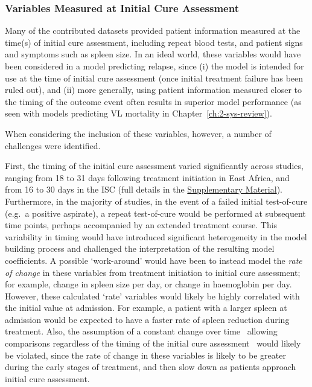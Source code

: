 \subsubsection{Variables Measured at Initial Cure Assessment}

Many of the contributed datasets provided patient information measured at the time(s) of initial cure assessment, including repeat blood tests, and patient signs and symptoms such as spleen size. In an ideal world, these variables would have been considered in a model predicting relapse, since (i) the model is intended for use at the time of initial cure assessment (once initial treatment failure has been ruled out), and (ii) more generally, using patient information measured closer to the timing of the outcome event often results in superior model performance (as seen with models predicting VL mortality in Chapter~\ref{ch:2-sys-review}).

When considering the inclusion of these variables, however, a number of challenges were identified.

First, the timing of the initial cure assessment varied significantly across studies, ranging from 18 to 31 days following treatment initiation in East Africa, and from 16 to 30 days in the ISC (full details in the \href{https://github.com/jpwil/dphil}{Supplementary Material}). Furthermore, in the majority of studies, in the event of a failed initial test-of-cure (e.g.\ a positive aspirate), a repeat test-of-cure would be performed at subsequent time points, perhaps accompanied by an extended treatment course. This variability in timing would have introduced significant heterogeneity in the model building process and challenged the interpretation of the resulting model coefficients. A possible `work-around' would have been to instead model the \textit{rate of change} in these variables from treatment initiation to initial cure assessment; for example, change in spleen size per day, or change in haemoglobin per day. However, these calculated `rate' variables would likely be highly correlated with the initial value at admission. For example, a patient with a larger spleen at admission would be expected to have a faster rate of spleen reduction during treatment. Also, the assumption of a constant change over time \textemdash\ allowing comparisons regardless of the timing of the initial cure assessment \textemdash\ would likely be violated, since the rate of change in these variables is likely to be greater during the early stages of treatment, and then slow down as patients approach initial cure assessment.


